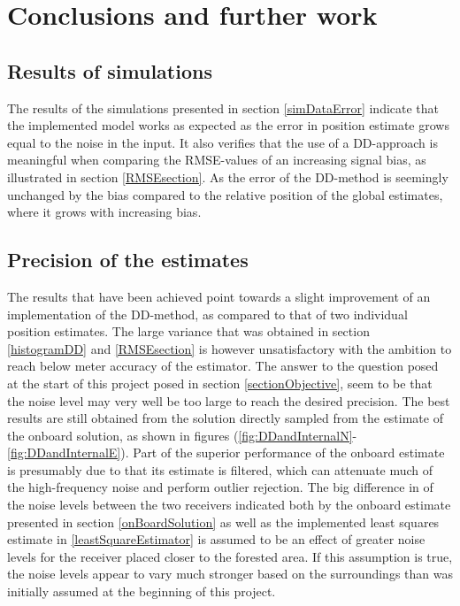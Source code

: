 

\chapter{Conclusions and further work}

\section{Results of simulations}
The results of the simulations presented in section \ref{simDataError} indicate that the implemented model works as expected as the error in position estimate grows equal to the noise in the input. It also verifies that the use of a DD-approach is meaningful when comparing the RMSE-values of an increasing signal bias, as illustrated in section \ref{RMSEsection}. As the error of the DD-method is seemingly unchanged by the bias compared to the relative position of the global estimates, where it grows with increasing bias.

\section{Precision of the estimates}\label{discussionPrecision}
The results that have been achieved point towards a slight improvement of an implementation of the DD-method, as compared to that of two individual position estimates. The large variance that was obtained in section \ref{histogramDD} and \ref{RMSEsection} is however unsatisfactory with the ambition to reach below meter accuracy of the estimator. The answer to the question posed at the start of this project posed in section \ref{sectionObjective}, seem to be that the noise level may very well be too large to reach the desired precision. The best results are still obtained from the solution directly sampled from the estimate of the onboard solution, as shown in figures (\ref{fig:DDandInternalN}-\ref{fig:DDandInternalE}). Part of the superior performance of the onboard estimate is presumably due to that its estimate is filtered, which can attenuate much of the high-frequency noise and perform outlier rejection. The big difference in of the noise levels between the two receivers indicated both by the onboard estimate presented in section \ref{onBoardSolution} as well as the implemented least squares estimate in \ref{leastSquareEstimator} is assumed to be an effect of greater noise levels for the receiver placed closer to the forested area. If this assumption is true, the noise levels appear to vary much stronger based on the surroundings than was initially assumed at the beginning of this project. 
